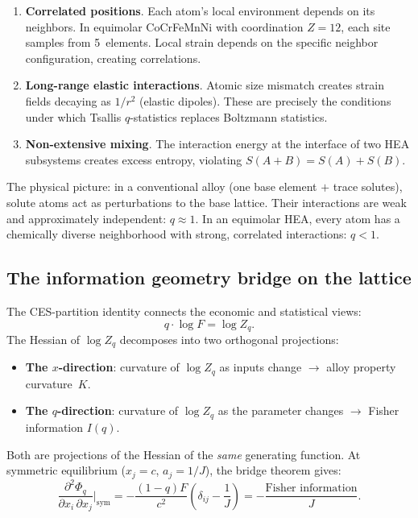 \documentclass[12pt,letterpaper]{article}
\theoremstyle{definition}
\begin{document}
\begin{enumerate}
  \item \textbf{Correlated positions}.  Each atom's local environment depends on its neighbors.  In equimolar CoCrFeMnNi with coordination $Z = 12$, each site samples from 5~elements.  Local strain depends on the specific neighbor configuration, creating correlations.

  \item \textbf{Long-range elastic interactions}.  Atomic size mismatch creates strain fields decaying as $1/r^2$ (elastic dipoles).  These are precisely the conditions under which Tsallis $q$-statistics replaces Boltzmann statistics.

  \item \textbf{Non-extensive mixing}.  The interaction energy at the interface of two HEA subsystems creates excess entropy, violating $S(A + B) = S(A) + S(B)$.
\end{enumerate}

The physical picture: in a conventional alloy (one base element $+$ trace solutes), solute atoms act as perturbations to the base lattice.  Their interactions are weak and approximately independent: $q \approx 1$.  In an equimolar HEA, every atom has a chemically diverse neighborhood with strong, correlated interactions: $q < 1$.

\subsection{The information geometry bridge on the lattice}

The CES-partition identity connects the economic and statistical views:
\begin{equation}\label{eq:bridge}
  q \cdot \log F = \log Z_q.
\end{equation}
The Hessian of $\log Z_q$ decomposes into two orthogonal projections:
\begin{itemize}
  \item \textbf{The $x$-direction}: curvature of $\log Z_q$ as inputs change $\to$ alloy property curvature~$K$.
  \item \textbf{The $q$-direction}: curvature of $\log Z_q$ as the parameter changes $\to$ Fisher information $I(q)$.
\end{itemize}

Both are projections of the Hessian of the \emph{same} generating function.  At symmetric equilibrium ($x_j = c$, $a_j = 1/J$), the bridge theorem gives:
\begin{equation}\label{eq:hessian_bridge}
  \frac{\partial^2 \Phi_q}{\partial x_i \, \partial x_j}\bigg|_{\mathrm{sym}} = -\frac{(1-q)F}{c^2}\left(\delta_{ij} - \frac{1}{J}\right) = -\frac{\text{Fisher information}}{J}.
\end{equation}
\end{document}
